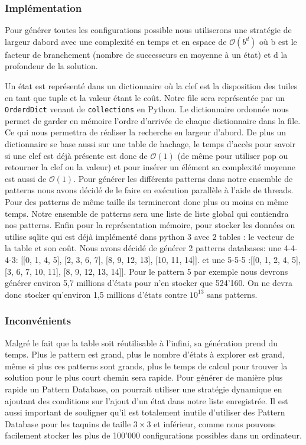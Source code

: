 \documentclass[a4paper, 12pt]{article}
\begin{document}
\subsubsection{Implémentation}
Pour générer toutes les configurations possible nous utiliserons une stratégie de largeur dabord avec une complexité en temps et en espace de $\mathcal{O}(b^{d})$ où b est le facteur de branchement (nombre de successeurs en moyenne à un état) et d la profondeur de la solution.

Un état est représenté dans un dictionnaire où la clef est la disposition des tuiles en tant que tuple et la valeur étant le coût. Notre file sera représentée par un \lstinline{OrderdDict} venant de \lstinline{collections} en Python. Le dictionnaire ordonnée nous permet de garder en mémoire l'ordre d'arrivée de chaque dictionnaire dans la file. Ce qui nous permettra de réaliser la recherche en largeur d'abord. 
De plus un dictionnaire se base aussi sur une table de hachage, le temps d'accès pour savoir si une clef est déjà présente est donc de $\mathcal{O}(1)$ (de même pour utiliser pop ou retourner la clef ou la valeur) et pour insérer un élément sa complexité moyenne est aussi de $\mathcal{O}(1)$.
Pour générer les différents patterns dans notre ensemble de patterns nous avons décidé de le faire en exécution parallèle à l'aide de threads. Pour des patterns de même taille ils termineront donc plus ou moins en même temps. Notre ensemble de patterns sera une liste de liste global qui contiendra nos patterns.
Enfin pour la représentation mémoire, pour stocker les données on utilise sqlite qui est déjà implémenté dans python 3 avec 2 tables : le vecteur de la table et son coût.
Nous avons décidé de générer 2 patterns databases: une 4-4-4-3: [[0, 1, 4, 5], [2, 3, 6, 7], [8, 9, 12, 13], [10, 11, 14]]. et une 5-5-5 :[[0, 1, 2, 4, 5], [3, 6, 7, 10, 11], [8, 9, 12, 13, 14]]. Pour le pattern 5 par exemple nous devrons générer environ 5,7 millions d'états pour n'en stocker que 524'160. On ne devra donc stocker qu'environ 1,5 millions d'états contre $10^{13}$ sans patterns.    
\subsubsection{Inconvénients}
Malgré le fait que la table soit réutilisable à l'infini, sa génération prend du temps. Plus le pattern est grand, plus le nombre d'états à explorer est grand, même si plus ces patterns sont grands, plus le temps de calcul pour trouver la solution pour le plus court chemin sera rapide. Pour générer de manière plus rapide un Pattern Database, on pourrait utiliser une stratégie dynamique en ajoutant des conditions sur l'ajout d'un état dans notre liste enregistrée.
Il est aussi important de souligner qu'il est totalement inutile d'utiliser des Pattern Database pour les taquins de taille $3 \times 3$ et inférieur, comme nous pouvons facilement stocker les plus de 100'000 configurations possibles dans un ordinateur.
\end{document}
